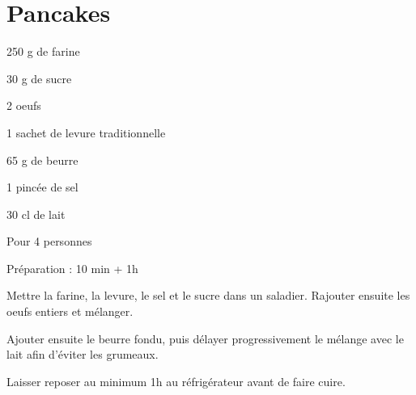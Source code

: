 \section[\normalsize{Pancakes}]{Pancakes}

\begin{ingredients}
\item 250 g de farine
\item 30 g de sucre
\item 2 oeufs
\item 1 sachet de levure traditionnelle 
\item 65 g de beurre 
\item 1 pinc\'ee de sel 
\item 30 cl de lait
\end{ingredients}
\begin{infos}
\item Pour 4 personnes
\item Préparation : 10 min + 1h
\end{infos}
\begin{etapes}
\item Mettre la farine, la levure, le sel et le sucre dans un saladier. Rajouter ensuite les oeufs entiers et m\'elanger.
\item Ajouter ensuite le beurre fondu, puis d\'elayer progressivement le m\'elange avec le lait afin d'\'eviter les 
grumeaux.
\item Laisser reposer au minimum 1h au r\'efrig\'erateur avant de faire cuire.
\end{etapes}
\begin{conseils}
\end{conseils}
